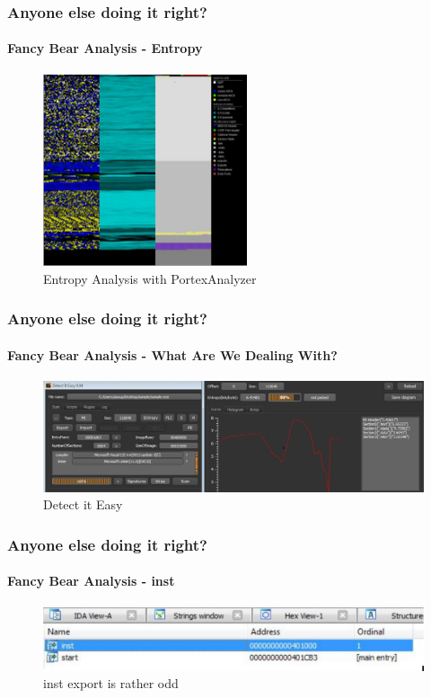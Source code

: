 \documentclass[aspectratio=169]{beamer}
\begin{document}
\begin{frame}
  \frametitle{Anyone else doing it right?}
  \framesubtitle{Fancy Bear Analysis - Entropy}
  \begin{center}
    \begin{figure}
      \includegraphics[width=6cm,keepaspectratio]{fancy_bear_portex_analyzer}
      \caption{Entropy Analysis with PortexAnalyzer}
    \end{figure}
  \end{center}
\end{frame}

\begin{frame}
  \frametitle{Anyone else doing it right?}
  \framesubtitle{Fancy Bear Analysis - What Are We Dealing With?}
  \begin{center}
    \begin{figure}
      \includegraphics[width=14cm,keepaspectratio]{fancy_bear_die}
      \caption{Detect it Easy}
    \end{figure}
  \end{center}
\end{frame}

\begin{frame}
  \frametitle{Anyone else doing it right?}
  \framesubtitle{Fancy Bear Analysis - inst}
  \begin{center}
    \begin{figure}
      \includegraphics[width=14cm,keepaspectratio]{fancy_bear_analysis_0}
      \caption{inst export is rather odd}
    \end{figure}
  \end{center}
\end{frame}
\end{document}
